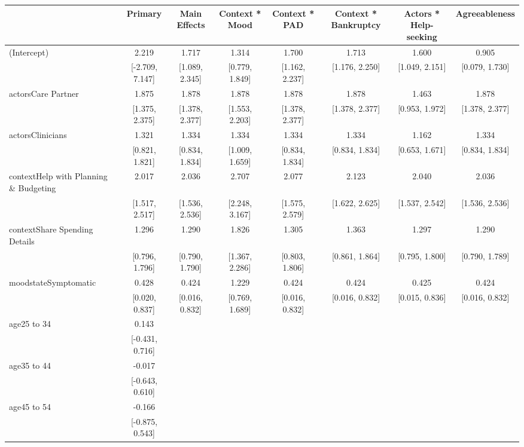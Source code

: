 \begin{tiny}
\begin{xltabular}{\textwidth}{lccccccc}
\toprule
  & \textbf{Primary} & \textbf{Main Effects} & \textbf{Context * Mood} & \textbf{Context * PAD} & \textbf{Context * Bankruptcy} & \textbf{Actors * Help-seeking} & \textbf{Agreeableness} \\ 
\midrule\addlinespace[2.5pt]
(Intercept) & 2.219 & 1.717 & 1.314 & 1.700 & 1.713 & 1.600 & 0.905 \\ 
 & [-2.709, 7.147] & [1.089, 2.345] & [0.779, 1.849] & [1.162, 2.237] & [1.176, 2.250] & [1.049, 2.151] & [0.079, 1.730] \\ 
actorsCare Partner & 1.875 & 1.878 & 1.878 & 1.878 & 1.878 & 1.463 & 1.878 \\ 
 & [1.375, 2.375] & [1.378, 2.377] & [1.553, 2.203] & [1.378, 2.377] & [1.378, 2.377] & [0.953, 1.972] & [1.378, 2.377] \\ 
actorsClinicians & 1.321 & 1.334 & 1.334 & 1.334 & 1.334 & 1.162 & 1.334 \\ 
 & [0.821, 1.821] & [0.834, 1.834] & [1.009, 1.659] & [0.834, 1.834] & [0.834, 1.834] & [0.653, 1.671] & [0.834, 1.834] \\ 
contextHelp with Planning \& Budgeting & 2.017 & 2.036 & 2.707 & 2.077 & 2.123 & 2.040 & 2.036 \\ 
 & [1.517, 2.517] & [1.536, 2.536] & [2.248, 3.167] & [1.575, 2.579] & [1.622, 2.625] & [1.537, 2.542] & [1.536, 2.536] \\ 
contextShare Spending Details & 1.296 & 1.290 & 1.826 & 1.305 & 1.363 & 1.297 & 1.290 \\ 
 & [0.796, 1.796] & [0.790, 1.790] & [1.367, 2.286] & [0.803, 1.806] & [0.861, 1.864] & [0.795, 1.800] & [0.790, 1.789] \\ 
moodstateSymptomatic & 0.428 & 0.424 & 1.229 & 0.424 & 0.424 & 0.425 & 0.424 \\ 
 & [0.020, 0.837] & [0.016, 0.832] & [0.769, 1.689] & [0.016, 0.832] & [0.016, 0.832] & [0.015, 0.836] & [0.016, 0.832] \\ 
age25 to 34 & 0.143 &  &  &  &  &  &  \\ 
 & [-0.431, 0.716] &  &  &  &  &  &  \\ 
age35 to 44 & -0.017 &  &  &  &  &  &  \\ 
 & [-0.643, 0.610] &  &  &  &  &  &  \\ 
age45 to 54 & -0.166 &  &  &  &  &  &  \\ 
 & [-0.875, 0.543] &  &  &  &  &  &  \\ 

\end{xltabular}
\end{tiny}
